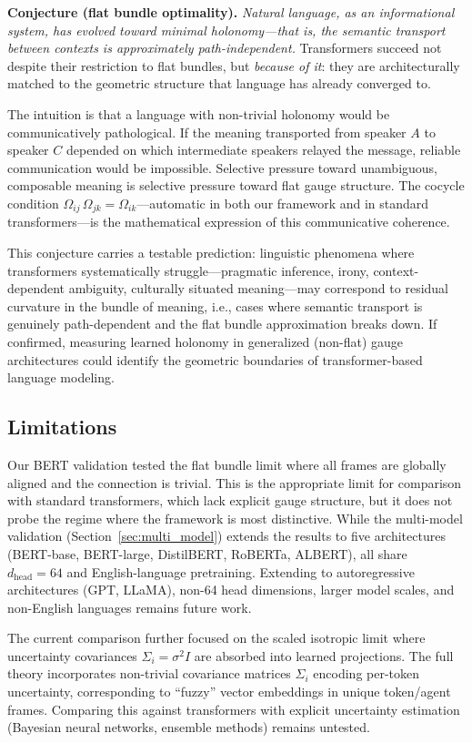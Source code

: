 \documentclass[twoside,11pt]{article}
\begin{document}
\textbf{Conjecture (flat bundle optimality).} \emph{Natural language, as an informational system, has evolved toward minimal holonomy---that is, the semantic transport between contexts is approximately path-independent.} Transformers succeed not despite their restriction to flat bundles, but \emph{because of it}: they are architecturally matched to the geometric structure that language has already converged to.

The intuition is that a language with non-trivial holonomy would be communicatively pathological. If the meaning transported from speaker $A$ to speaker $C$ depended on which intermediate speakers relayed the message, reliable communication would be impossible. Selective pressure toward unambiguous, composable meaning is selective pressure toward flat gauge structure. The cocycle condition $\Omega_{ij}\,\Omega_{jk} = \Omega_{ik}$---automatic in both our framework and in standard transformers---is the mathematical expression of this communicative coherence.

This conjecture carries a testable prediction: linguistic phenomena where transformers systematically struggle---pragmatic inference, irony, context-dependent ambiguity, culturally situated meaning---may correspond to residual curvature in the bundle of meaning, i.e., cases where semantic transport is genuinely path-dependent and the flat bundle approximation breaks down. If confirmed, measuring learned holonomy in generalized (non-flat) gauge architectures could identify the geometric boundaries of transformer-based language modeling.

\subsection{Limitations}

Our BERT validation tested the flat bundle limit where all frames are globally aligned and the connection is trivial. This is the appropriate limit for comparison with standard transformers, which lack explicit gauge structure, but it does not probe the regime where the framework is most distinctive. While the multi-model validation (Section~\ref{sec:multi_model}) extends the results to five architectures (BERT-base, BERT-large, DistilBERT, RoBERTa, ALBERT), all share $d_{\text{head}} = 64$ and English-language pretraining. Extending to autoregressive architectures (GPT, LLaMA), non-64 head dimensions, larger model scales, and non-English languages remains future work.

The current comparison further focused on the scaled isotropic limit where uncertainty covariances $\Sigma_i = \sigma^2 I$ are absorbed into learned projections. The full theory incorporates non-trivial covariance matrices $\Sigma_i$ encoding per-token uncertainty, corresponding to ``fuzzy'' vector embeddings in unique token/agent frames. Comparing this against transformers with explicit uncertainty estimation (Bayesian neural networks, ensemble methods) remains untested.
\end{document}
